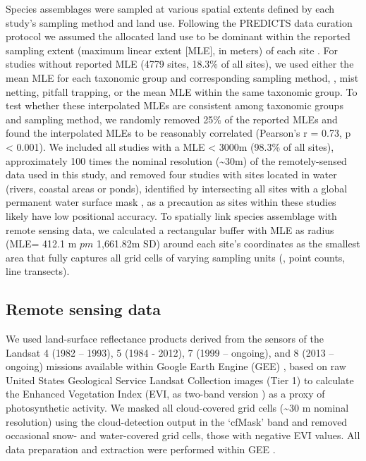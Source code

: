 Species assemblages were sampled at various spatial extents defined by each study’s sampling method and land use. Following the PREDICTS data curation protocol we assumed the allocated land use to be dominant within the reported sampling extent (maximum linear extent [MLE], in meters) of each site \citep{Hudson2014,Hudson2016}. For studies without reported MLE (4779 sites, 18.3\% of all sites), we used either the mean MLE for each taxonomic group and corresponding sampling method, \eg, mist netting, pitfall trapping, or the mean MLE within the same taxonomic group. To test whether these interpolated MLEs are consistent among taxonomic groups and sampling method, we randomly removed 25\% of the reported MLEs and found the interpolated MLEs to be reasonably correlated (Pearson’s r = 0.73, p < 0.001). We included all studies with a MLE < 3000m (98.3\% of all sites), approximately 100 times the nominal resolution (\textasciitilde 30m) of the remotely-sensed data used in this study, and removed four studies with sites located in water (rivers, coastal areas or ponds), identified by intersecting all sites with a global permanent water surface mask \citep{Pekel2016}, as a precaution as sites within these studies likely have low positional accuracy. To spatially link species assemblage with remote sensing data, we calculated a rectangular buffer with MLE as radius (MLE= 412.1 m $pm$ 1,661.82m SD) around each site’s coordinates as the smallest area that fully captures all grid cells of varying sampling units (\eg, point counts, line transects). 

\subsection{Remote sensing data} 
\label{C03_0202}
We used land-surface reflectance products derived from the sensors of the Landsat 4 (1982 – 1993), 5 (1984 - 2012), 7 (1999 – ongoing), and 8 (2013 – ongoing) missions available within Google Earth Engine (GEE) \citep{Gorelick2017}, based on raw United States Geological Service Landsat Collection images (Tier 1) to calculate the Enhanced Vegetation Index (EVI, as two-band version \cite{Jiang2008}) as a proxy of photosynthetic activity. We masked all cloud-covered grid cells (\textasciitilde 30 m nominal resolution) using the cloud-detection output in the ‘cfMask’ band \citep{Zhu2012} and removed occasional snow- and water-covered grid cells, \ie those with negative EVI values. All data preparation and extraction were performed within GEE \citep{Gorelick2017}.

